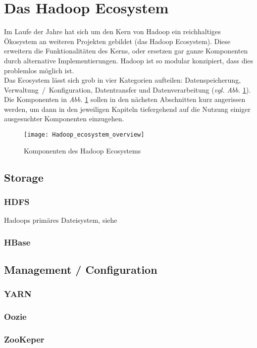 \section{Das Hadoop Ecosystem}
Im Laufe der Jahre hat sich um den Kern von Hadoop ein reichhaltiges Ökosystem an weiteren Projekten gebildet (das Hadoop Ecosystem). Diese erweitern die Funktionalitäten des Kerns, oder ersetzen gar ganze Komponenten durch alternative Implementierungen. Hadoop ist so modular konzipiert, dass dies problemlos möglich ist.  \\
Das Ecosystem lässt sich grob in vier Kategorien aufteilen: Datenspeicherung, Verwaltung~/~Konfiguration, Datentransfer und Datenverarbeitung (\textit{vgl. Abb. }\ref{fig:ecosys}). Die Komponenten in \textit{Abb. }\ref{fig:ecosys} sollen in den nächsten Abschnitten kurz angerissen werden, um dann in den jeweiligen Kapiteln tiefergehend auf die Nutzung einiger ausgesuchter Komponenten einzugehen.

\begin{figure}[ht]
    \centering
    \texttt{[image: Hadoop\_ecosystem\_overview]}
    \caption[Komponenten des Hadoop Ecosystems]{Komponenten des Hadoop Ecosystems\parencite{van_der_weel_hadoop_2015}}
    \label{fig:ecosys}
\end{figure}

\subsection{Storage}
\subsubsection*{HDFS}
Hadoops primäres Dateisystem, siehe 
\subsubsection*{HBase}

\subsection{Management / Configuration}
\subsubsection*{YARN}
\subsubsection*{Oozie}
\subsubsection*{ZooKeper}
